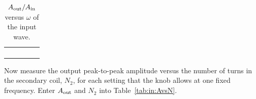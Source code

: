 \begin{table}[htb]
\begin{center}
\begin{tabular}{|c|c|c|c|c|}
\hline
\hspace*{2.5cm} & \hspace*{2.5cm} & \hspace*{2.5cm} & \hspace*{2.5cm} &
\hspace*{2.5cm} \\
\hspace*{2.5cm} & \hspace*{2.5cm} & \hspace*{2.5cm} & \hspace*{2.5cm} &
\hspace*{2.5cm} \\


\hline
\hspace*{2.5cm} & \hspace*{2.5cm} & \hspace*{2.5cm} & \hspace*{2.5cm} &
\hspace*{2.5cm} \\
\hspace*{2.5cm} & \hspace*{2.5cm} & \hspace*{2.5cm} & \hspace*{2.5cm} &
\hspace*{2.5cm} \\


\hline
\end{tabular}
\end{center}
\caption{$A_{\rm{out}}/A_{\rm{in}}$ versus $\omega$ of the
input wave.}
\label{tab:in:Avsw}
\end{table}

\noindent Now measure the output peak-to-peak amplitude versus the number of
turns in the secondary coil, $N_2$, for each setting that the knob allows at
one fixed frequency. Enter $A_{\rm{out}}$ and $N_2$ into
Table~\ref{tab:in:AvsN}.

